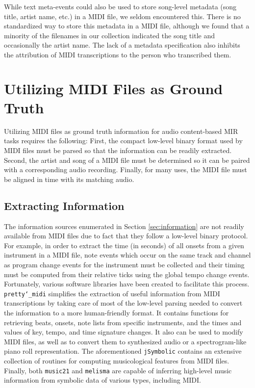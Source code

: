 \documentclass{article}
\begin{document}
While text meta-events could also be used to store song-level metadata (song title, artist name, etc.) in a MIDI file, we seldom encountered this.
There is no standardized way to store this metadata in a MIDI file, although we found that a minority of the filenames in our collection indicated the song title and occasionally the artist name.
The lack of a metadata specification also inhibits the attribution of MIDI transcriptions to the person who transcribed them.

\section{Utilizing MIDI Files as Ground Truth}
\label{sec:utilizing}

Utilizing MIDI files as ground truth information for audio content-based MIR tasks requires the following:
First, the compact low-level binary format used by MIDI files must be parsed so that the information can be readily extracted.
Second, the artist and song of a MIDI file must be determined so it can be paired with a corresponding audio recording.
Finally, for many uses, the MIDI file must be aligned in time with its matching audio.

\subsection{Extracting Information}

The information sources enumerated in Section \ref{sec:information} are not readily available from MIDI files due to fact that they follow a low-level binary protocol.
For example, in order to extract the time (in seconds) of all onsets from a given instrument in a MIDI file, note events which occur on the same track and channel as program change events for the instrument must be collected and their timing must be computed from their relative ticks using the global tempo change events.
Fortunately, various software libraries have been created to facilitate this process.
\texttt{pretty\char`_midi} \cite{raffel2014pretty_midi} simplifies the extraction of useful information from MIDI transcriptions by taking care of most of the low-level parsing needed to convert the information to a more human-friendly format.
It contains functions for retrieving beats, onsets, note lists from specific instruments, and the times and values of key, tempo, and time signature changes.
It also can be used to modify MIDI files, as well as to convert them to synthesized audio or a spectrogram-like piano roll representation.
The aforementioned \texttt{jSymbolic} contains an extensive collection of routines for computing musicological features from MIDI files.
Finally, both \texttt{music21} and \texttt{melisma} are capable of inferring high-level music information from symbolic data of various types, including MIDI.
\end{document}
